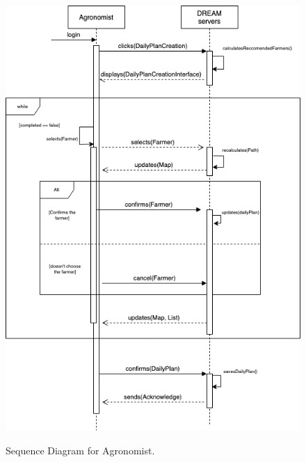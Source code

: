\begin{figure}[hbt!]
\centering
\includegraphics[scale=0.6]{Files/sequence_disgrams/thePNGs/agronomist_createPlan.png}\\
\caption{\label{tab:addOne{figure_counter}}Sequence Diagram for Agronomist.}
\end{figure}

